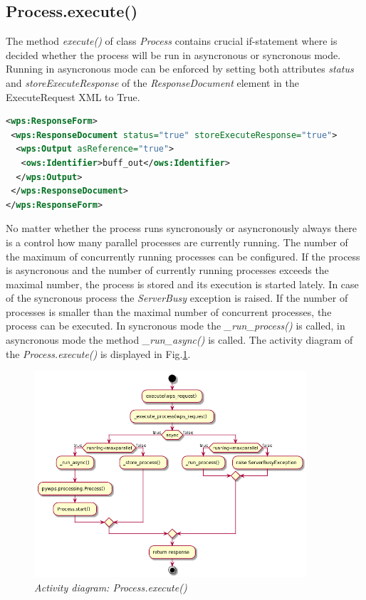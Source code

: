 \documentclass[12pt,a4paper]{article}
\begin{document}
\subsection{Process.execute()}
The method \textit{execute()} of class \textit{Process} contains crucial if-statement where is decided whether the process will be
run in asyncronous or syncronous mode. Running in asyncronous mode can be enforced by setting both attributes \textit{status} and \textit{storeExecuteResponse} of the \textit{ResponseDocument} element in the ExecuteRequest XML to True.

\bigskip
\begin{lstlisting}[basicstyle=\small,caption={ReponseForm element of ExecuteRequest XML},language=XML,label={lst:Execute_ResponseForm}]
<wps:ResponseForm>
 <wps:ResponseDocument status="true" storeExecuteResponse="true">
  <wps:Output asReference="true">
   <ows:Identifier>buff_out</ows:Identifier>
  </wps:Output>
 </wps:ResponseDocument>
</wps:ResponseForm>
\end{lstlisting}
\bigskip 

No matter whether the process runs syncronously or asyncronously always there is a control how many parallel processes are currently
running. The number of the maximum of concurrently running processes can be configured. If the process is asyncronous and the number of currently running processes exceeds the maximal number, the process is stored and its execution is started lately. In case of the syncronous process the \textit{ServerBusy} exception is raised. If the number of processes is smaller than the maximal number of 
concurrent processes, the process can be executed. In syncronous mode the \textit{\_run\_process()} is called, in asyncronous mode the method \textit{\_run\_async()} is called. The activity diagram of the \textit{Process.execute()} is displayed in Fig.\ref{fig:Diag_process_execute}.

\begin{figure}[h!]
\centering
\includegraphics[width=0.9\textwidth]{img/Diag_process_execute.png}
\caption{\textit{Activity diagram: Process.execute()}}
\label{fig:Diag_process_execute}
\end{figure}
\end{document}
